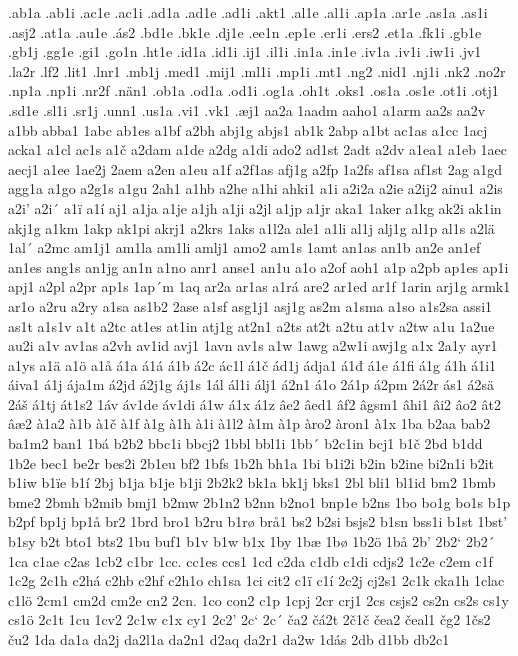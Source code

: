 .ab1a
.ab1i
.ac1e
.ac1i
.ad1a
.ad1e
.ad1i
.akt1
.al1e
.al1i
.ap1a
.ar1e
.as1a
.as1i
.asj2
.at1a
.au1e
.ás2
.bd1e
.bk1e
.dj1e
.ee1n
.ep1e
.er1i
.ers2
.et1a
.fk1i
.gb1e
.gb1j
.gg1e
.gi1
.go1n
.ht1e
.id1a
.id1i
.ij1
.il1i
.in1a
.in1e
.iv1a
.iv1i
.iw1i
.jv1
.la2r
.lf2
.lit1
.lnr1
.mb1j
.med1
.mij1
.ml1i
.mp1i
.mt1
.ng2
.nid1
.nj1i
.nk2
.no2r
.np1a
.np1i
.nr2f
.nän1
.ob1a
.od1a
.od1i
.og1a
.oh1t
.oks1
.os1a
.os1e
.ot1i
.otj1
.sd1e
.sl1i
.sr1j
.unn1
.us1a
.vi1
.vk1
.æj1
aa2a
1aadm
aaho1
a1arm
aa2s
aa2v
a1bb
abba1
1abc
ab1es
a1bf
a2bh
abj1g
abjs1
ab1k
2abp
a1bt
ac1as
a1cc
1acj
acka1
a1cl
ac1s
a1č
a2dam
a1de
a2dg
a1di
ado2
ad1st
2adt
a2dv
a1ea1
a1eb
1aec
aecj1
a1ee
1ae2j
2aem
a2en
a1eu
a1f
a2f1as
afj1g
a2fp
1a2fs
af1sa
af1st
2ag
a1gd
agg1a
a1go
a2g1s
a1gu
2ah1
a1hb
a2he
a1hi
ahki1
a1i
a2i2a
a2ie
a2ij2
ainu1
a2is
a2i'
a2i´
a1ï
a1í
aj1
a1ja
a1je
a1jh
a1ji
a2jl
a1jp
a1jr
aka1
1aker
a1kg
ak2i
ak1in
akj1g
a1km
1akp
ak1pi
akrj1
a2krs
1aks
a1l2a
ale1
a1li
al1j
alj1g
al1p
al1s
a2lä
1al´
a2mc
am1j1
am1la
am1li
amlj1
amo2
am1s
1amt
an1as
an1b
an2e
an1ef
an1es
ang1s
an1jg
an1n
a1no
anr1
anse1
an1u
a1o
a2of
aoh1
a1p
a2pb
ap1es
ap1i
apj1
a2pl
a2pr
ap1s
1ap´m
1aq
ar2a
ar1as
a1rá
are2
ar1ed
ar1f
1arin
arj1g
armk1
ar1o
a2ru
a2ry
a1sa
as1b2
2ase
a1sf
asg1j1
asj1g
as2m
a1sma
a1so
a1s2sa
assi1
as1t
a1s1v
a1t
a2tc
at1es
at1in
atj1g
at2n1
a2ts
at2t
a2tu
at1v
a2tw
a1u
1a2ue
au2i
a1v
av1as
a2vh
av1id
avj1
1avn
av1s
a1w
1awg
a2w1i
awj1g
a1x
2a1y
ayr1
a1ys
a1ä
a1ö
a1å
á1a
á1á
á1b
á2c
ác1l
á1č
ád1j
ádja1
á1đ
á1e
á1fi
á1g
á1h
á1i1
áiva1
á1j
ája1m
á2jd
á2j1g
áj1s
1ál
ál1i
álj1
á2n1
á1o
2á1p
á2pm
2á2r
ás1
á2sä
2áš
á1tj
át1s2
1áv
áv1de
áv1di
á1w
á1x
á1z
âe2
âed1
âf2
âgsm1
âhi1
âi2
âo2
ât2
âæ2
à1a2
à1b
à1č
à1f
à1g
à1h
à1i
à1l2
à1m
à1p
àro2
àron1
à1x
1ba
b2aa
bab2
ba1m2
ban1
1bá
b2b2
bbc1i
bbcj2
1bbl
bbl1i
1bb´
b2c1in
bcj1
b1č
2bd
b1dd
1b2e
bec1
be2r
bes2i
2b1eu
bf2
1bfs
1b2h
bh1a
1bi
b1i2i
b2in
b2ine
bi2n1i
b2it
b1iw
b1ïe
b1í
2bj
b1ja
b1je
b1ji
2b2k2
bk1a
bk1j
bks1
2bl
bli1
bl1id
bm2
1bmb
bme2
2bmh
b2mib
bmj1
b2mw
2b1n2
b2nn
b2no1
bnp1e
b2ns
1bo
bo1g
bo1s
b1p
b2pf
bp1j
bp1å
br2
1brd
bro1
b2ru
b1rø
brå1
bs2
b2si
bsjs2
b1sn
bss1i
b1st
1bst'
b1sy
b2t
bto1
bts2
1bu
buf1
b1v
b1w
b1x
1by
1bæ
1bø
1b2ö
1bå
2b'
2b2`
2b2´
1ca
c1ae
c2as
1cb2
c1br
1cc.
cc1es
ccs1
1cd
c2da
c1db
c1di
cdjs2
1c2e
c2em
c1f
1c2g
2c1h
c2há
c2hb
c2hf
c2h1o
ch1sa
1ci
cit2
c1ï
c1í
2c2j
cj2s1
2c1k
cka1h
1clac
c1lö
2cm1
cm2d
cm2e
cn2
2cn.
1co
con2
c1p
1cpj
2cr
crj1
2cs
csjs2
cs2n
cs2s
cs1y
cs1ö
2c1t
1cu
1cv2
2c1w
c1x
cy1
2c2'
2c`
2c´
ča2
čá2t
2č1č
čea2
čeal1
čg2
1čs2
ču2
1da
da1a
da2j
da2l1a
da2n1
d2aq
da2r1
da2w
1dás
2db
d1bb
db2c1
